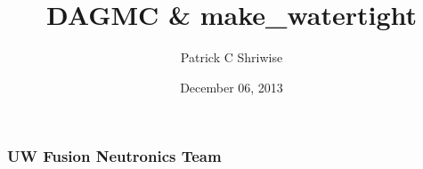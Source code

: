 \documentclass{beamer}
\begin{document}
\title{DAGMC \& make\_watertight}
\author{Patrick C Shriwise}
\date{ December 06, 2013}
\maketitle

\begin{frame}
\frametitle{UW Fusion Neutronics Team}

\end{frame}
\end{document}

